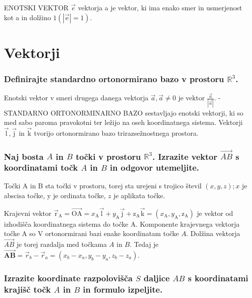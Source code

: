 \documentclass{article}
\begin{document}
ENOTSKI VEKTOR $\vec{e}$ vektorja a je vektor, ki ima enako smer in usmerjenost kot a in dolžino $1(|\overrightarrow{\mathrm{e}}|=1)$.

\section{Vektorji}
\subsubsection*{Definirajte standardno ortonormirano bazo v prostoru $\mathbb{R}^{3}$.}

Enotski vektor v smeri drugega danega vektorja $\overrightarrow{a}, \overrightarrow{a} \neq 0$ je vektor $\frac{\overrightarrow{a}}{|\overrightarrow{a}|}$. - STANDARNO ORTONORMINARNO BAZO sestavljajo enotski vektorji, ki so med sabo paroma pravokotni ter ležijo na oseh koordinatnega sistema. Vektorji $\overrightarrow{\mathrm{l}}, \overrightarrow{\mathrm{j}}$ in $\overrightarrow{\mathrm{k}}$ tvorijo ortonormirano bazo trirazsežnostnega prostora.

\subsubsection*{Naj bosta $A$ in $B$ točki v prostoru $\mathbb{R}^{3}$. Izrazite vektor $\overrightarrow{A B}$ s koordinatami točk $A$ in $B$ in odgovor utemeljite.}

Točki A in B sta točki v prostoru, torej sta urejeni s trojico števil $(x, y, z) ; x$ je abscisa točke, y je ordinata točke, $z$ je aplikata točke.

Krajevni vektor $\overrightarrow{\mathrm{r}}_{\mathrm{A}}=\overrightarrow{\mathrm{OA}}=x_{\mathrm{A}} \overrightarrow{\mathrm{l}}+y_{\mathrm{A}} \overrightarrow{\mathrm{j}}+\mathrm{z}_{\mathrm{A}} \overrightarrow{\mathrm{k}}=\left(x_{\mathrm{A}}, y_{\mathrm{A}}, \mathrm{z}_{\mathrm{A}}\right)$ je vektor od izhodišča koordinatnega sistema do točke A. Komponente krajevnega vektorja točke A so $\mathrm{V}$ ortonormirani bazi enake koordinatam točke $A$. Dolžina vektorja $\overrightarrow{A B}$ je torej razdalja med točkama $A$ in $B$. Tedaj je $\overrightarrow{\mathbf{A B}}=\overrightarrow{r}_{b}-\overrightarrow{r}_{a}=\left(x_{b}-x_{a}, y_{b}-y_{a}, z_{b}-z_{a}\right)$.

\subsubsection*{Izrazite koordinate razpolovišča $S$ daljice $A B$ s koordinatami krajišč točk $A$ in $B$ in formulo izpeljite.}
\end{document}
